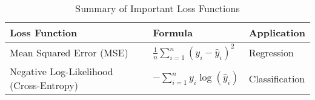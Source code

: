 \begin{table}[htb!]
\caption{Summary of Important Loss Functions}
\label{Table:LossFunctions}
\centering
\footnotesize
\begin{tabularx}{\textwidth}{@{}lXl@{}}
\toprule
\textbf{Loss Function} & \textbf{Formula} & \textbf{Application} \\
\midrule
Mean Squared Error (MSE) & \( \frac{1}{n} \sum_{i=1}^n (y_i - \hat{y}_i)^2 \) & Regression \\
\addlinespace
Negative Log-Likelihood (Cross-Entropy) & \( -\sum_{i=1}^n y_i \log(\hat{y}_i) \) & Classification \\
\bottomrule
\end{tabularx}
\end{table}
